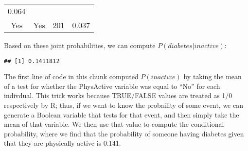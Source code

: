 \documentclass[]{book}
\newenvironment{Shaded}{\begin{snugshade}}{\end{snugshade}}
\newcommand{\KeywordTok}[1]{\textcolor[rgb]{0.13,0.29,0.53}{\textbf{#1}}}
\newcommand{\StringTok}[1]{\textcolor[rgb]{0.31,0.60,0.02}{#1}}
\newcommand{\CommentTok}[1]{\textcolor[rgb]{0.56,0.35,0.01}{\textit{#1}}}
\newcommand{\OperatorTok}[1]{\textcolor[rgb]{0.81,0.36,0.00}{\textbf{#1}}}
\newcommand{\NormalTok}[1]{#1}
\theoremstyle{definition}
\theoremstyle{definition}
\theoremstyle{definition}
\theoremstyle{remark}
\begin{document}
\begin{longtable}[]{@{}cccc@{}}
\begin{minipage}[t]{0.09\columnwidth}
0.064\strut
\end{minipage}\tabularnewline
\begin{minipage}[t]{0.14\columnwidth}\centering\strut
Yes\strut
\end{minipage} & \begin{minipage}[t]{0.16\columnwidth}\centering\strut
Yes\strut
\end{minipage} & \begin{minipage}[t]{0.09\columnwidth}\centering\strut
201\strut
\end{minipage} & \begin{minipage}[t]{0.09\columnwidth}\centering\strut
0.037\strut
\end{minipage}\tabularnewline
\bottomrule
\end{longtable}

Based on these joint probabilities, we can compute
\(P(diabetes|inactive)\):

\begin{Shaded}
\end{Shaded}

\begin{verbatim}
## [1] 0.1411812
\end{verbatim}

The first line of code in this chunk computed \(P(inactive)\) by taking
the mean of a test for whether the PhysActive variable was equal to
``No'' for each indivdual. This trick works because TRUE/FALSE values
are treated as 1/0 respectively by R; thus, if we want to know the
probaility of some event, we can generate a Boolean variable that tests
for that event, and then simply take the mean of that variable. We then
use that value to compute the conditional probability, where we find
that the probability of someone having diabetes given that they are
physically active is 0.141.
\end{document}
